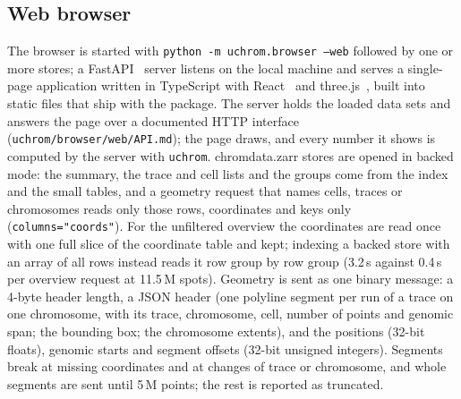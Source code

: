 \documentclass[11pt]{article}
\newcommand{\pkg}[1]{\texttt{#1}}
\begin{document}
\subsection*{Web browser}
The browser is started with \pkg{python -m uchrom.browser --web} followed by one or more stores; a FastAPI~\citep{fastapi} server listens on the local machine and serves a single-page application written in TypeScript with React~\citep{react} and three.js~\citep{threejs}, built into static files that ship with the package.
The server holds the loaded data sets and answers the page over a documented HTTP interface (\pkg{uchrom/browser/web/API.md}); the page draws, and every number it shows is computed by the server with \pkg{uchrom}.
chromdata.zarr stores are opened in backed mode: the summary, the trace and cell lists and the groups come from the index and the small tables, and a geometry request that names cells, traces or chromosomes reads only those rows, coordinates and keys only (\pkg{columns="coords"}).
For the unfiltered overview the coordinates are read once with one full slice of the coordinate table and kept; indexing a backed store with an array of all rows instead reads it row group by row group (3.2\,s against 0.4\,s per overview request at 11.5\,M spots).
Geometry is sent as one binary message: a 4-byte header length, a JSON header (one polyline segment per run of a trace on one chromosome, with its trace, chromosome, cell, number of points and genomic span; the bounding box; the chromosome extents), and the positions (32-bit floats), genomic starts and segment offsets (32-bit unsigned integers).
Segments break at missing coordinates and at changes of trace or chromosome, and whole segments are sent until 5\,M points; the rest is reported as truncated.
\end{document}
